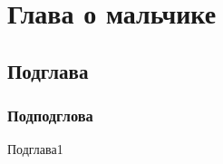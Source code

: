 \documentclass[12pt]{article}
\begin{document}
\section{Глава о мальчике}
\subsection{Подглава}
\subsubsection{Подподглова}
\makeatletter
\renewcommand{\subsection}{ }
\makeatother
\subsection{Подглава1}
\end{document}

